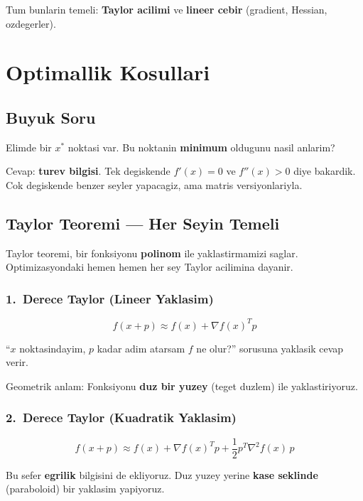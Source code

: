 \documentclass[12pt,a4paper]{article}
\theoremstyle{definition}
\theoremstyle{remark}
\begin{document}
Tum bunlarin temeli: \textbf{Taylor acilimi} ve \textbf{lineer cebir} (gradient, Hessian, ozdegerler).


\newpage
\section{Optimallik Kosullari}

\subsection{Buyuk Soru}

Elimde bir $x^*$ noktasi var. Bu noktanin \textbf{minimum} oldugunu nasil anlarim?

Cevap: \textbf{turev bilgisi}. Tek degiskende $f'(x) = 0$ ve $f''(x) > 0$ diye bakardik. Cok degiskende benzer seyler yapacagiz, ama matris versiyonlariyla.

\subsection{Taylor Teoremi --- Her Seyin Temeli}

Taylor teoremi, bir fonksiyonu \textbf{polinom} ile yaklastirmamizi saglar. Optimizasyondaki hemen hemen her sey Taylor acilimina dayanir.

\subsubsection{1.\ Derece Taylor (Lineer Yaklasim)}

\[
f(x + p) \approx f(x) + \nabla f(x)^T p
\]

``$x$ noktasindayim, $p$ kadar adim atarsam $f$ ne olur?'' sorusuna yaklasik cevap verir.

Geometrik anlam: Fonksiyonu \textbf{duz bir yuzey} (teget duzlem) ile yaklastiriyoruz.

\subsubsection{2.\ Derece Taylor (Kuadratik Yaklasim)}

\[
f(x + p) \approx f(x) + \nabla f(x)^T p + \frac{1}{2} p^T \nabla^2 f(x) \, p
\]

Bu sefer \textbf{egrilik} bilgisini de ekliyoruz. Duz yuzey yerine \textbf{kase seklinde} (paraboloid) bir yaklasim yapiyoruz.
\end{document}
